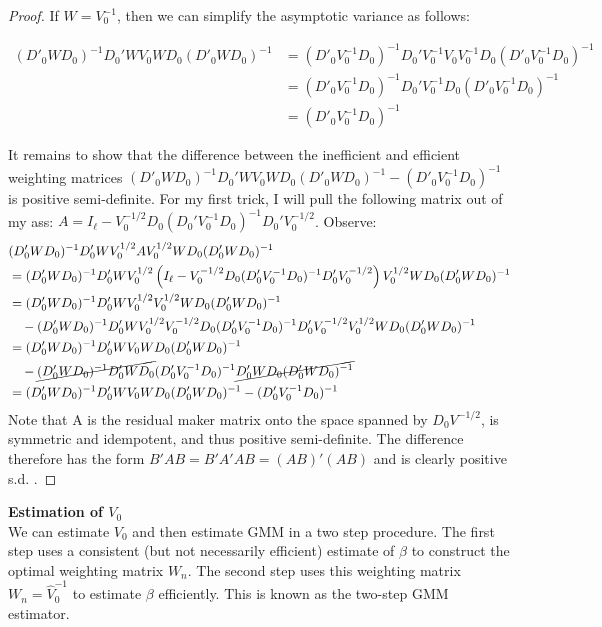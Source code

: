 \documentclass[DIV=14,titlepage=false]{scrreprt}
\begin{document}
\begin{proof}
    If $W = V_0^{-1}$, then we can simplify the asymptotic variance as follows:
    
    \begin{align*}
        (D'_0WD_0)^{-1}D_0'WV_0WD_0(D'_0WD_0)^{-1} &= (D'_0V_0^{-1}D_0)^{-1}D_0'V_0^{-1}V_0V_0^{-1}D_0(D'_0V_0^{-1}D_0)^{-1}\\
        &= (D'_0V_0^{-1}D_0)^{-1}D_0'V_0^{-1}D_0(D'_0V_0^{-1}D_0)^{-1}\\
        &= (D'_0V_0^{-1}D_0)^{-1}
    \end{align*}

    It remains to show that the difference between the inefficient and efficient weighting matrices $(D'_0WD_0)^{-1}D_0'WV_0WD_0(D'_0WD_0)^{-1} - (D'_0V_0^{-1}D_0)^{-1}$ is positive semi-definite. For my first trick, I will pull the following matrix out of my ass: $A = I_{\ell}-V_0^{-1/2}D_0(D_0'V_0^{-1}D_0)^{-1}D_0'V_0^{-1/2}$. Observe:
    \begin{align*}
       & (D'_0WD_0)^{-1}D_0'WV_0^{1/2}AV_0^{1/2}WD_0 (D'_0WD_0)^{-1}\\
        &= (D'_0WD_0)^{-1}D_0'WV_0^{1/2}\left(I_{\ell}-V_0^{-1/2}D_0(D_0'V_0^{-1}D_0)^{-1}D_0'V_0^{-1/2}\right)V_0^{1/2}WD_0 (D'_0WD_0)^{-1}\\
        &= (D'_0WD_0)^{-1}D_0'WV_0^{1/2}V_0^{1/2}WD_0 (D'_0WD_0)^{-1}\\ &\quad- (D'_0WD_0)^{-1}D_0'WV_0^{1/2}V_0^{-1/2}D_0(D_0'V_0^{-1}D_0)^{-1}D_0'V_0^{-1/2}V_0^{1/2}WD_0 (D'_0WD_0)^{-1}\\
        &= (D'_0WD_0)^{-1}D_0'WV_0WD_0 (D'_0WD_0)^{-1}\\ &\quad - \cancel{(D'_0WD_0)^{-1}D_0'WD_0}(D_0'V_0^{-1}D_0)^{-1}\cancel{D_0'WD_0 (D'_0WD_0)^{-1}}\\
        &= (D'_0WD_0)^{-1}D_0'WV_0WD_0 (D'_0WD_0)^{-1} - (D_0'V_0^{-1}D_0)^{-1}
    \end{align*}
    Note that A is the residual maker matrix onto the space spanned by $D_0V^{-1/2}$, is  symmetric and idempotent, and thus positive semi-definite. 
    The difference therefore has the form $B'AB=B'A'AB=(AB)'(AB)$ and is clearly positive s.d. .
\end{proof}
\textbf{Estimation of $V_0$} \\
We can estimate $V_0$ and then estimate GMM in a two step procedure. The first step uses a consistent (but not necessarily efficient) estimate of $\beta$ to construct the optimal weighting matrix $W_n$. The second step uses this weighting matrix $W_n = \hat V_0^{-1}$ to estimate $\beta$ efficiently. This is known as the two-step GMM estimator.\\
\end{document}
